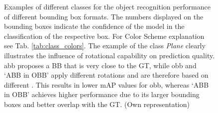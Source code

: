 \begin{figure}[h!]
\begin{tabularx}{\textwidth}{c|*{9}{X}}
\end{tabularx}
\caption[aab and obb: Examples of different classes for the object recognition performance]{Examples of different classes for the object recognition performance of different bounding box formats. The numbers displayed on the bounding boxes indicate the confidence of the model in the classification of the respective box. For Color Scheme explanation see Tab. \ref{tab:class_colors}. The example of the class \textit{Plane} clearly illustrates the influence of rotational capability on prediction quality. \acrshort{abb} proposes a \acrshort{BB} that is very close to the \acrshort{GT}, while \acrshort{obb} and ‘ABB in OBB’ apply different rotations and are therefore based on different . This results in lower \acrshort{mAP} values for \acrshort{obb}, whereas ‘ABB in OBB’ achieves higher performance due to its larger bounding boxes and better overlap with the \acrshort{GT}. (Own representation)}
\label{fig:aab_obb_example_pics}
\end{figure}